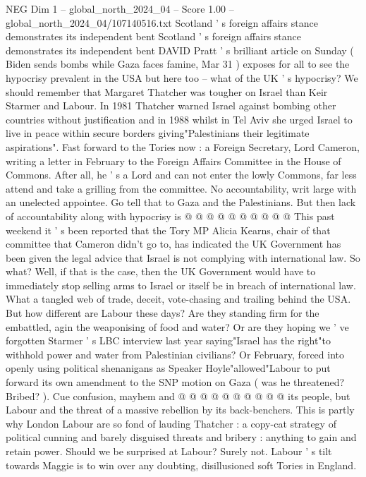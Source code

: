 \begin{textsample}{NEG Dim 1 – global\_north\_2024\_04 – Score 1.00 – global\_north\_2024\_04/107140516.txt}  \label{ex:f1_neg_301}
Scotland ' s foreign affairs stance demonstrates its independent bent Scotland ' s foreign affairs stance demonstrates its independent bent DAVID Pratt ' s brilliant article on Sunday ( Biden sends bombs while Gaza faces famine, Mar 31 ) exposes for all to see the hypocrisy prevalent in the USA but here too -- what of the UK ' s hypocrisy?
We should remember that Margaret Thatcher was tougher on Israel than Keir Starmer and Labour.
In 1981 Thatcher warned Israel against bombing other countries without justification and in 1988 whilst in Tel Aviv she urged Israel to live in peace within secure borders giving"Palestinians their legitimate aspirations".
Fast forward to the Tories now : a Foreign Secretary, Lord Cameron, writing a letter in February to the Foreign Affairs Committee in the House of Commons.
After all, he ' s a Lord and can not enter the lowly Commons, far less attend and take a grilling from the committee.
No accountability, writ large with an unelected appointee.
Go tell that to Gaza and the Palestinians.
But then lack of accountability along with hypocrisy is @ @ @ @ @ @ @ @ @ @ This past weekend it ' s been reported that the Tory MP Alicia Kearns, chair of that committee that Cameron didn't go to, has indicated the UK Government has been given the legal advice that Israel is not complying with international law.
So what?
Well, if that is the case, then the UK Government would have to immediately stop selling arms to Israel or itself be in breach of international law.
What a tangled web of trade, deceit, vote-chasing and trailing behind the USA.
But how different are Labour these days?
Are they standing firm for the embattled, agin the weaponising of food and water?
Or are they hoping we ' ve forgotten Starmer ' s LBC interview last year saying"Israel has the right"to withhold power and water from Palestinian civilians?
Or February, forced into openly using political shenanigans as Speaker Hoyle"allowed"Labour to put forward its own amendment to the SNP motion on Gaza ( was he threatened?
Bribed? ).
Cue confusion, mayhem and @ @ @ @ @ @ @ @ @ @ its people, but Labour and the threat of a massive rebellion by its back-benchers.
This is partly why London Labour are so fond of lauding Thatcher : a copy-cat strategy of political cunning and barely disguised threats and bribery : anything to gain and retain power.
Should we be surprised at Labour?
Surely not.
Labour ' s tilt towards Maggie is to win over any doubting, disillusioned soft Tories in England.

\end{textsample}
